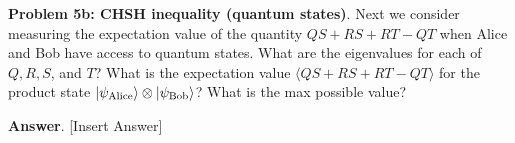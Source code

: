 \textbf{Problem 5b: CHSH inequality (quantum states)}. Next we consider measuring the expectation value of the quantity $QS + RS + RT - QT$ when Alice and Bob have access to quantum states. 
What are the eigenvalues for each of $Q, R, S$, and $T$? 
What is the expectation value $\langle QS + RS + RT - QT \rangle$ for the product state $\ket{\psi_{\text{Alice}}} \otimes \ket{\psi_{\text{Bob}}}$? 
What is the max possible value?


\textbf{Answer}. [Insert Answer]


